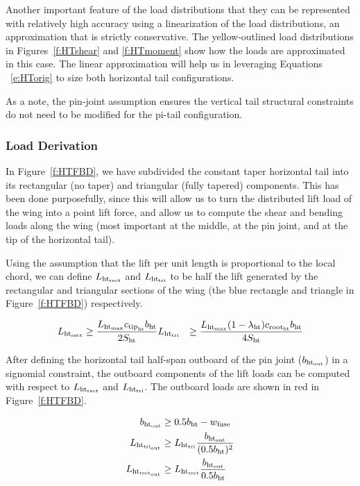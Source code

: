 Another important feature of the load distributions that they can be represented
with relatively high accuracy using a linearization of the load distributions,
an approximation that is strictly conservative.
The yellow-outlined load distributions in Figures~\ref{f:HTshear} and \ref{f:HTmoment}
show how the loads are approximated
in this case. The linear approximation will help us in leveraging Equations
~\ref{e:HTorig} to size both horizontal tail configurations.

As a note, the pin-joint assumption ensures the vertical tail structural constraints do not
need to be modified for the pi-tail configuration. 

\subsubsection{Load Derivation}

In Figure~\ref{f:HTFBD}, we have subdivided the constant taper horizontal tail into its
rectangular (no taper) and triangular (fully tapered) components. This has been done
purposefully, since this will allow us to turn the distributed lift load of the wing into
a point lift force, and allow us to compute the shear and bending loads along the wing
(most important at the middle, at the pin joint, and at the tip of the horizontal tail).

Using the assumption
that the lift per unit length is proportional to the local chord, we can define
$L_{\rm{ht}_{rect}}$ and $L_{\rm{ht}_{\rm{tri}}}$
to be half the lift generated by the rectangular and triangular
sections of the wing (the blue rectangle and triangle in Figure~\ref{f:HTFBD}) respectively.

\begin{align}
    L_{\rm{ht}_{rect}} &\geq \frac{L_{\rm{ht}_{\rm{max}}} c_{\rm{tip}_{\rm{ht}}} b_{\rm{ht}}}{2 S_{\rm{ht}}}
    L_{\rm{ht}_{\rm{\rm{tri}}}} &\geq \frac{L_{\rm{ht}_{\rm{max}}} (1 - \lambda_{\rm{ht}}) c_{\rm{root}_{\rm{ht}}} b_{\rm{ht}}}{4
S_{\rm{ht}}}
\end{align}
 
After defining the horizontal tail half-span outboard of the pin joint 
($b_{\rm{ht}_{\rm{out}}}$) in a signomial constraint,
the outboard components of the lift loads can be computed
with respect to $L_{\rm{ht}_{rect}}$ and $L_{\rm{ht}_{\rm{tri}}}$. The outboard loads are shown 
in red in Figure~\ref{f:HTFBD}.
 
 \begin{align}
     b_{\rm{ht}_{\rm{out}}} &\geq 0.5b_{\rm{ht}} - w_{\textrm{fuse}}\\
     L_{\rm{ht}_{tri_{\rm{out}}}} &\geq L_{\rm{ht}_{\rm{tri}}} \frac{b_{\rm{ht}_{\rm{out}}}}{(0.5b_{\rm{ht}})^2}\\
     L_{\rm{ht}_{\rm{rect}_{\rm{out}}}} &\geq L_{\rm{ht}_{rect}} \frac{b_{\rm{ht}_{\rm{out}}}}{0.5b_{\rm{ht}}}
 \end{align}
 
